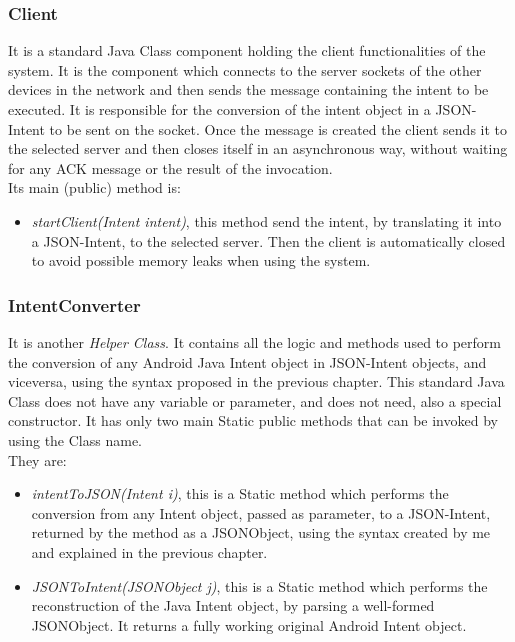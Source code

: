 \subsubsection{Client}
It is a standard Java Class component holding the client functionalities of the system. It is the component which connects to the  server sockets of the other devices in the network and then sends the message containing the intent to be executed. It is responsible for the conversion of the intent object in a JSON-Intent to be sent on the socket. Once the message is created the client sends it to the selected server and then closes itself in an asynchronous way, without waiting for any ACK message or the result of the invocation.\\
Its main (public) method is:
\begin{itemize}
	\item \textit{startClient(Intent intent)}, this method send the intent, by translating it into a JSON-Intent, to the selected server. Then the client is automatically closed to avoid possible memory leaks when using the system. 
\end{itemize}
\subsubsection{IntentConverter}
It is another \textit{Helper Class}. It contains all the logic and methods used to perform the conversion of any Android Java Intent object in JSON-Intent objects, and viceversa, using the syntax proposed in the previous chapter. This standard Java Class does not have any variable or parameter, and does not need, also a special constructor. It has only two main Static public methods that can be invoked by using the Class name. \\They are:
\begin{itemize}
	\item \textit{intentToJSON(Intent i)}, this is a Static method which performs the conversion from any Intent object, passed as parameter, to a JSON-Intent, returned by the method as a JSONObject, using the syntax created by me and explained in the previous chapter.
	\item \textit{JSONToIntent(JSONObject j)}, this is a Static method which performs the reconstruction of the Java Intent object, by parsing a well-formed JSONObject. It returns a fully working original Android Intent object.
\end{itemize}
